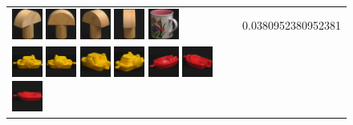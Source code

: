 \begin{figure}[tbp]
\begin{center}
\begin{tabular}{m{11cm} | m{3cm} |}
\includegraphics[width=1cm]{coil/beeld-3.eps}
\includegraphics[width=1cm]{coil/beeld-1.eps}
\includegraphics[width=1cm]{coil/beeld-4.eps}
\includegraphics[width=1cm]{coil/beeld-2.eps}
\includegraphics[width=1cm]{coil/beeld-10.eps}
& {\scriptsize 0.0380952380952381}
\\
\includegraphics[width=1cm]{coil/beeld-12.eps}
\includegraphics[width=1cm]{coil/beeld-13.eps}
\includegraphics[width=1cm]{coil/beeld-16.eps}
\includegraphics[width=1cm]{coil/beeld-15.eps}
\includegraphics[width=1cm]{coil/beeld-21.eps}
\includegraphics[width=1cm]{coil/beeld-22.eps}
\includegraphics[width=1cm]{coil/beeld-18.eps}

\end{tabular}
\end{center}
\end{figure}
